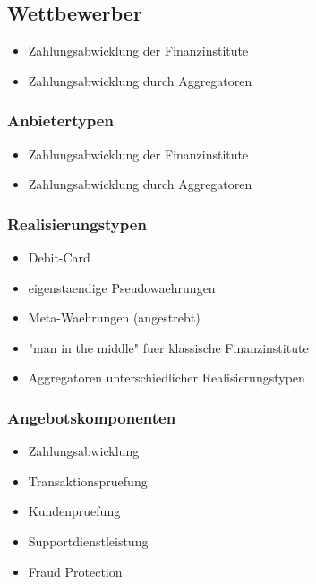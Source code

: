 \subsection{Wettbewerber}

\begin{itemize}
 \item Zahlungsabwicklung der Finanzinstitute
 \item Zahlungsabwicklung durch Aggregatoren
\end{itemize}


\subsubsection{Anbietertypen}

\begin{itemize}
 \item Zahlungsabwicklung der Finanzinstitute
 \item Zahlungsabwicklung durch Aggregatoren
\end{itemize}
 

\subsubsection{Realisierungstypen}

\begin{itemize}
 \item Debit-Card
 \item eigenstaendige Pseudowaehrungen
 \item Meta-Waehrungen (angestrebt)
 \item "man in the middle" fuer klassische Finanzinstitute
 \item Aggregatoren unterschiedlicher Realisierungstypen
\end{itemize}


\subsubsection{Angebotskomponenten}

\begin{itemize}
 \item Zahlungsabwicklung
 \item Transaktionspruefung
 \item Kundenpruefung
 \item Supportdienstleistung
 \item Fraud Protection
\end{itemize}

